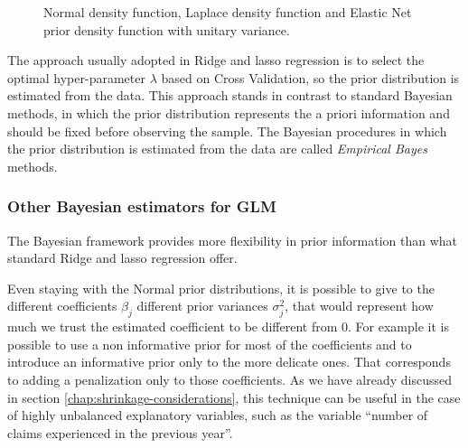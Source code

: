 \documentclass[a4paper, twoside, openright, 12pt]{report}
\theoremstyle{definition}
\theoremstyle{definition}
\theoremstyle{definition}
\theoremstyle{remark}
\begin{document}
\begin{figure}[!hbtp]

{\centering {}\newline{}

}

\caption[Normal density function, Laplace density function and Elastic Net prior density function with unitary variance.]{Normal density function, Laplace density function and Elastic Net prior density function with unitary variance.}\label{fig:normal-laplace}
\end{figure}

The approach usually adopted in Ridge and \ac{lasso} regression is to select the optimal hyper-parameter \(\lambda\) based on Cross Validation, so the prior distribution is estimated from the data. This approach stands in contrast to standard Bayesian methods, in which the prior distribution represents the a priori information and should be fixed before observing the sample. The Bayesian procedures in which the prior distribution is estimated from the data are called \emph{Empirical Bayes} methods.

\hypertarget{other-bayesian-estimators-for-glm}{%
\subsubsection{Other Bayesian estimators for GLM}\label{other-bayesian-estimators-for-glm}}

The Bayesian framework provides more flexibility in prior information than what standard Ridge and \ac{lasso} regression offer.

Even staying with the Normal prior distributions, it is possible to give to the different coefficients \(\beta_j\) different prior variances \(\sigma_j^2\), that would represent how much we trust the estimated coefficient to be different from \(0\). For example it is possible to use a non informative prior for most of the coefficients and to introduce an informative prior only to the more delicate ones. That corresponds to adding a penalization only to those coefficients. As we have already discussed in section \ref{chap:shrinkage-considerations}, this technique can be useful in the case of highly unbalanced explanatory variables, such as the variable ``number of claims experienced in the previous year''.
\end{document}
